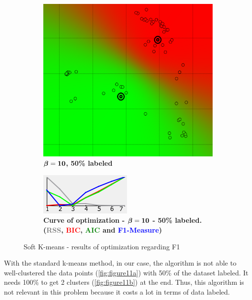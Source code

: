 \begin{figure}[h]
\begin{subfigure}[h]{0.25\textwidth}
    \includegraphics[height=0.15\textheight]{./clustering/opt_F1_50__soft_k__beta_10_range7.png}
	\caption{$\boldsymbol \beta \bf = 10$\bf, 50\% labeled}
    \label{fig:figure10b}
    \end{subfigure}
    \hspace{20mm}
    \begin{subfigure}[h]{0.50\textwidth}
    \centering
    \includegraphics[height=0.15\textheight]{./clustering/curve_opt_F1_50__soft_k__beta_10_range7.png}
	\caption{\bf Curve of optimization - $\boldsymbol \beta \bf = 10$ - 50\% labeled. (\textcolor{gray}{RSS}, \textcolor{red}{BIC}, \textcolor{green}{AIC} and \textcolor{blue}{F1-Measure})}
    \label{fig:figure10d}
    \end{subfigure}
\caption{Soft K-means - results of optimization regarding F1}
\label{fig:figure10}
\end{figure}

With the standard k-means method, in our case, the algorithm is not able to well-clustered the data points (\ref{fig:figure11a}) with 50\% of the dataset labeled. It needs 100\% to get 2 clusters (\ref{fig:figure11b}) at the end. Thus, this algorithm is not relevant in this problem because it costs a lot in terms of data labeled. 

